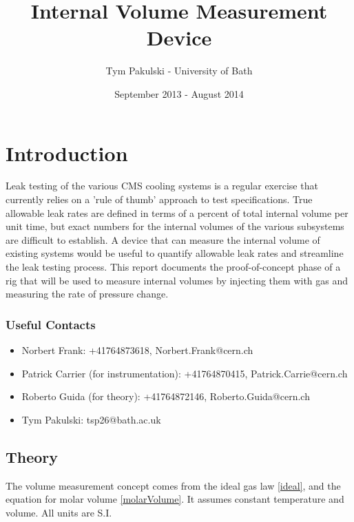 \documentclass{report}
\author{Tym Pakulski - University of Bath}
\title{Internal Volume Measurement Device}
\date{September 2013 - August 2014}
\begin{document}
\graphicspath{{./images/}}
\maketitle
\tableofcontents
\section{Introduction}
Leak testing of the various CMS cooling systems is a regular exercise that currently relies on a 'rule of thumb' approach to test specifications. True allowable leak rates are defined in terms of a percent of total internal volume per unit time, but exact numbers for the internal volumes of the various subsystems are difficult to establish. A device that can measure the internal volume of existing systems would be useful to quantify allowable leak rates and streamline the leak testing process.
This report documents the proof-of-concept phase of a rig that will be used to measure internal volumes by injecting them with gas and measuring the rate of pressure change. 
\subsubsection{Useful Contacts}
\begin{itemize}
	\item{Norbert Frank: +41764873618, Norbert.Frank@cern.ch }
	\item{Patrick Carrier (for instrumentation): +41764870415, Patrick.Carrie@cern.ch}
	\item{Roberto Guida (for theory): +41764872146, Roberto.Guida@cern.ch}
	\item{Tym Pakulski: tsp26@bath.ac.uk}
\end{itemize}
\subsection{Theory}\label{theory}
The volume measurement concept comes from the ideal gas law \eqref{ideal}, and the equation for molar volume \eqref{molarVolume}. It assumes constant temperature and volume. All units are S.I.
\end{document}
